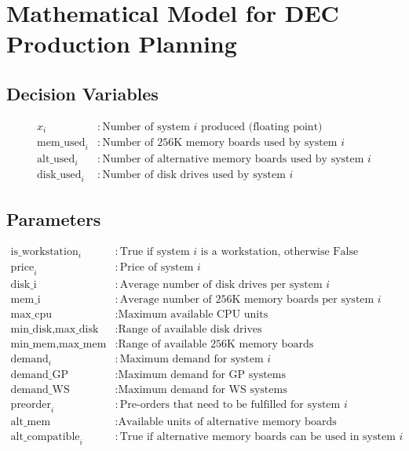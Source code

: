 \documentclass{article}
\begin{document}
\section*{Mathematical Model for DEC Production Planning}

\subsection*{Decision Variables}
\begin{align*}
x_i & : \text{Number of system } i \text{ produced (floating point)} \\
\text{mem\_used}_i & : \text{Number of 256K memory boards used by system } i \\
\text{alt\_used}_i & : \text{Number of alternative memory boards used by system } i \\
\text{disk\_used}_i & : \text{Number of disk drives used by system } i
\end{align*}

\subsection*{Parameters}
\begin{align*}
\text{is\_workstation}_i & : \text{True if system } i \text{ is a workstation, otherwise False} \\
\text{price}_i & : \text{Price of system } i \\
\text{disk\_i} & : \text{Average number of disk drives per system } i \\
\text{mem\_i} & : \text{Average number of 256K memory boards per system } i \\
\text{max\_cpu} & : \text{Maximum available CPU units} \\
\text{min\_disk}, \text{max\_disk} & : \text{Range of available disk drives} \\
\text{min\_mem}, \text{max\_mem} & : \text{Range of available 256K memory boards} \\
\text{demand}_i & : \text{Maximum demand for system } i \\
\text{demand\_GP} & : \text{Maximum demand for GP systems} \\
\text{demand\_WS} & : \text{Maximum demand for WS systems} \\
\text{preorder}_i & : \text{Pre-orders that need to be fulfilled for system } i \\
\text{alt\_mem} & : \text{Available units of alternative memory boards} \\
\text{alt\_compatible}_i & : \text{True if alternative memory boards can be used in system } i
\end{align*}
\end{document}
